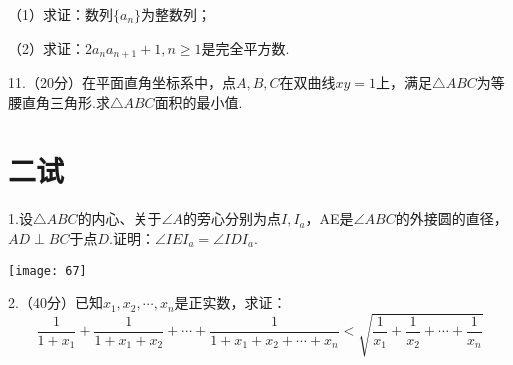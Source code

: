 （1）求证：数列$\{a_n \}$为整数列；

（2）求证：$2a_na_{n+1}+1,n\geq 1$是完全平方数.
\vspace{100mm}

11.（20分）在平面直角坐标系中，点$A,B,C$在双曲线$xy=1$上，满足$\bigtriangleup ABC$为等腰直角三角形.求$\bigtriangleup ABC$面积的最小值.

\newpage
\section*{二试}
1.设$\bigtriangleup ABC$的内心、关于$\angle A$的旁心分别为点$I,I_a$，AE是$\angle ABC$的外接圆的直径，$AD\perp BC$于点$D$.证明：$\angle IEI_a=\angle IDI_a$.
\begin{flushleft}
    \texttt{[image: 67]}
\end{flushleft}
\vspace{20mm}

2.（40分）已知$x_1,x_2,\cdots,x_n$是正实数，求证：
\[
    \frac{1}{1+x_1}+\frac{1}{1+x_1+x_2}+\cdots+\frac{1}{1+x_1+x_2+\cdots+x_n}<\sqrt{\frac{1}{x_1}+\frac{1}{x_2}+\cdots+\frac{1}{x_n}}
    \]


